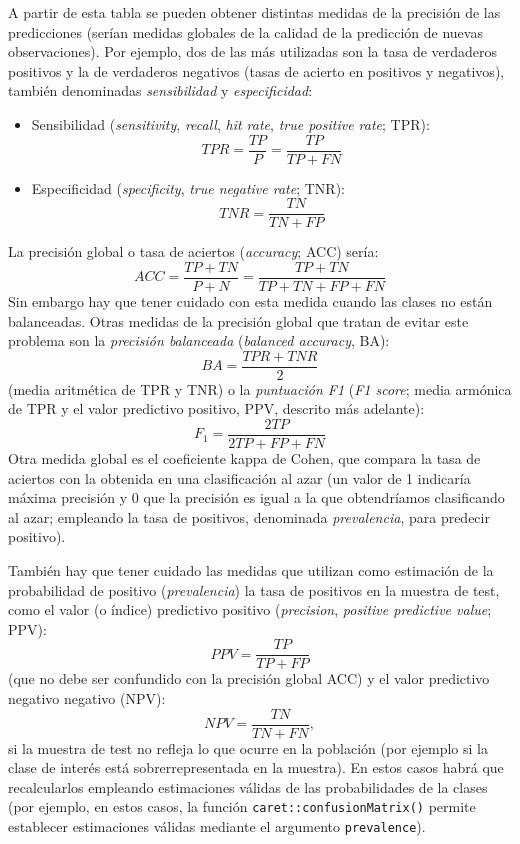 \documentclass[
  spanish,
]{book}
\theoremstyle{break}
\theoremstyle{definition}
\theoremstyle{definition}
\theoremstyle{definition}
\theoremstyle{definition}
\theoremstyle{remark}
\begin{document}
A partir de esta tabla se pueden obtener distintas medidas de la precisión de las predicciones (serían medidas globales de la calidad de la predicción de nuevas observaciones).
Por ejemplo, dos de las más utilizadas son la tasa de verdaderos positivos y la de verdaderos negativos (tasas de acierto en positivos y negativos), también denominadas \emph{sensibilidad} y \emph{especificidad}:

\begin{itemize}
\item
  Sensibilidad (\emph{sensitivity}, \emph{recall}, \emph{hit rate}, \emph{true positive rate}; TPR):
  \[TPR = \frac{TP}{P} = \frac{TP}{TP+FN}\]
\item
  Especificidad (\emph{specificity}, \emph{true negative rate}; TNR):
  \[TNR = \frac{TN}{TN+FP}\]
\end{itemize}

La precisión global o tasa de aciertos (\emph{accuracy}; ACC) sería:
\[ACC = \frac{TP + TN}{P + N} = \frac{TP+TN}{TP+TN+FP+FN}\]
Sin embargo hay que tener cuidado con esta medida cuando las clases no están balanceadas.
Otras medidas de la precisión global que tratan de evitar este problema son la \emph{precisión balanceada} (\emph{balanced accuracy}, BA):
\[BA = \frac{TPR + TNR}{2}\]
(media aritmética de TPR y TNR) o la \emph{puntuación F1} (\emph{F1 score}; media armónica de TPR y el valor predictivo positivo, PPV, descrito más adelante):
\[F_1 = \frac{2TP}{2TP+FP+FN}\]
Otra medida global es el coeficiente kappa de Cohen, que compara la tasa de aciertos con la obtenida en una clasificación al azar
(un valor de 1 indicaría máxima precisión y 0 que la precisión es igual a la que obtendríamos clasificando al azar; empleando la tasa de positivos, denominada \emph{prevalencia}, para predecir positivo).

También hay que tener cuidado las medidas que utilizan como estimación de la probabilidad de positivo (\emph{prevalencia}) la tasa de positivos en la muestra de test, como el valor (o índice) predictivo positivo (\emph{precision}, \emph{positive predictive value}; PPV):
\[PPV = \frac{TP}{TP+FP}\]
(que no debe ser confundido con la precisión global ACC) y el valor predictivo negativo negativo (NPV):
\[NPV = \frac{TN}{TN+FN},\]
si la muestra de test no refleja lo que ocurre en la población (por ejemplo si la clase de interés está sobrerrepresentada en la muestra).
En estos casos habrá que recalcularlos empleando estimaciones válidas de las probabilidades de la clases (por ejemplo, en estos casos, la función \texttt{caret::confusionMatrix()} permite establecer estimaciones válidas mediante el argumento \texttt{prevalence}).
\end{document}
